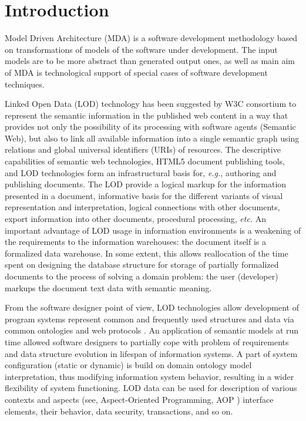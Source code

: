 \documentclass[conference,a4paper]{IEEEtran}
\begin{document}
\section{Introduction}

Model Driven Architecture (MDA) is a software development methodology based on transformations of models of the software under development.  The input models are to be more abstract than generated output ones, as well as main aim of MDA is technological support of special cases of software development techniques.

Linked Open Data (LOD) \cite{Bizer} technology has been suggested by W3C consortium to represent the semantic information in the published web content in a way that provides not only the possibility of its processing with software agents (Semantic Web), but also to link all available information into a single semantic graph using relations and global universal identifiers (URIs) of resources. The descriptive capabilities of semantic web technologies, HTML5 document publishing tools, and LOD technologies form an infrastructural basis for, \emph{e.g.}, authoring and publishing documents. The LOD provide a logical markup for the information presented in a document, informative basis for the different variants of visual representation and interpretation, logical connections with other documents, export information into other documents, procedural processing, \emph{etc.} An important advantage of LOD usage in information environments is a weakening of the requirements to the information warehouses: the document itself is a formalized data warehouse. In some extent, this allows reallocation of the time spent on designing the database structure for storage of partially formalized documents to the process of solving a domain problem: the user (developer) markups the document text data with semantic meaning.

From the software designer point of view, LOD technologies allow development of program systems represent common and frequently used structures and data via common ontologies and web protocols \cite{Cherk}.  An application of semantic models at run time \cite{Kopay} allowed software designers to partially cope with problem of requirements and data structure evolution in lifespan of information systems.  A part of system configuration (static or dynamic) is build on domain ontology model interpretation, thus modifying information system behavior, resulting in a wider flexibility of system functioning.  LOD data can be used for description of various contexts and aspects (see, Aspect-Oriented Programming, AOP \cite{AOP}) interface elements, their behavior, data security, transactions, and so on.
\end{document}
